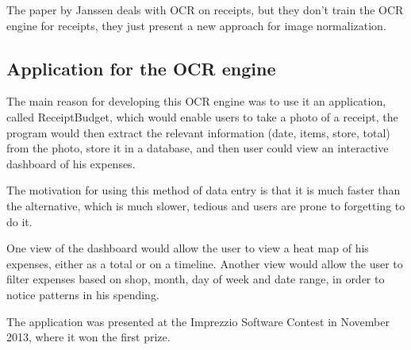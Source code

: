 The paper by Janssen\cite{janssen2012receipts2go} deals with OCR on receipts, but they don't train the OCR engine for receipts, they just present a new approach for image normalization.

\subsection{Application for the OCR engine}
The main reason for developing this OCR engine was to use it an application, called ReceiptBudget, which would enable users to take a photo of a receipt, the program would then extract the relevant information (date, items, store, total) from the photo, store it in a database, and then user could view an interactive dashboard of his expenses.

The motivation for using this method of data entry is that it is much faster than the alternative, which is much slower, tedious and users are prone to forgetting to do it. 

One view of the dashboard would allow the user to view a heat map of his expenses, either as a total or on a timeline. Another view would allow the user to filter expenses based on shop, month, day of week and date range, in order to notice patterns in his spending. 

The application was presented at the Imprezzio Software Contest in November 2013, where it won the first prize\cite{WinNT}.

